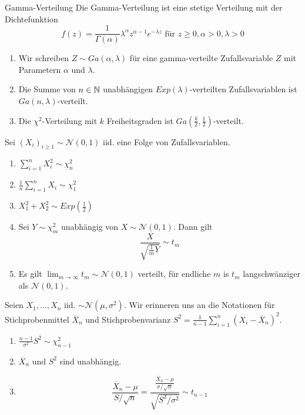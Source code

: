 \begin{subbox}{Gamma-Verteilung}
	Die Gamma-Verteilung ist eine stetige Verteilung mit der Dichtefunktion
	\[f(z) = \frac{1}{\Gamma(\alpha)}\lambda^{\alpha}z^{\alpha-1}e^{-\lambda z} \text{ für } z \geq 0, \alpha >0, \lambda > 0\]
	\begin{enumerate}
		\item Wir schreiben $Z \sim Ga(\alpha, \lambda)$ für eine gamma-verteilte Zufallsvariable $Z$ mit Parametern $\alpha$ und $\lambda$.
		\item Die Summe von $n \in \mathbb{N}$ unabhängigen $Exp(\lambda)$-verteilten Zufallsvariablen ist $Ga(n, \lambda)$-verteilt.
		\item Die $\chi^2$-Verteilung mit $k$ Freiheitsgraden ist $Ga\left(\frac{k}{2}, \frac{1}{2}\right)$-verteilt. 
	\end{enumerate}
\end{subbox}
Sei $(X_i)_{i \geq 1} \sim \mathcal{N}(0,1)$ iid. eine Folge von Zufallsvariablen. 
\begin{enumerate}
	\item $\sum_{i = 1}^{n} X_i^2 \sim \chi^2_n$
	\item $\frac{1}{n}\sum_{i = 1}^n X_i \sim \chi_1^2$
	\item $X_1^2 + X_2^2 \sim Exp\left(\frac{1}{2}\right)$
	\item Sei $Y \sim \chi_m^2$ unabhängig von $X \sim \mathcal{N}(0,1)$. Dann gilt \[\frac{X}{\sqrt{\frac{1}{m}Y}} \sim t_m\] 
	\item Es gilt $\lim_{m\to\infty} t_m \sim \mathcal{N}(0,1)$ verteilt, für endliche $m$ is $t_m$ langschwänziger als $\mathcal{N}(0,1).$
\end{enumerate}
Seien $X_1, \ldots, X_n$ iid. $\sim \mathcal{N}(\mu, \sigma^2)$.
Wir erinneren uns an die Notationen für Stichprobenmittel $\overline{X}_n$ und Stichprobenvarianz $S^2 = \frac{1}{n-1}\sum_{i = 1}^n(X_i - \overline{X}_n)^2$.
\begin{enumerate}
	\item $\frac{n-1}{\sigma^2}S^2 \sim \chi_{n-1}^2$
	\item $\overline{X}_n$ und $S^2$ sind unabhängig.
	\item \[\frac{\overline{X}_n - \mu}{S/\sqrt{n}} = \frac{\frac{\overline{X}_n - \mu}{\sigma / \sqrt{n}}}{\sqrt{S^2/\sigma^2}} \sim t_{n-1}\]
\end{enumerate}

